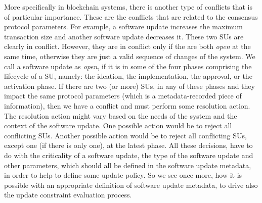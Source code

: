 More specifically in blockchain systems, there is another type of conflicts that is of particular importance. These are the conflicts that are related to the consensus protocol parameters. For example, a software update increases the maximum transaction size and another software update decreases it. These two SUs are clearly in conflict. However, they are in conflict only if the are both \emph{open} at the same time, otherwise they are just a valid sequence of changes of the system. We call a software update as \emph{open}, if it is in some of the four phases comprising the lifecycle of a SU, namely: the ideation, the implementation, the approval, or the activation phase. If there are two (or more) SUs, in any of these phases and they impact the same protocol parameters (which is a metadata-recorded piece of information), then we have a conflict and must perform some resolution action. The resolution action might vary based on the needs of the system and the context of the software update. One possible action would be to reject all conflicting SUs. Another possible action would be to reject all conflicting SUs, except one (if there is only one), at the latest phase. All these decisions, have to do with the criticality of a software update, the type of the software update and other parameters, which should all be defined in the software update metadata, in order to help to define some update policy. So we see once more, how it is possible with an appropriate definition of software update metadata, to drive also the update constraint evaluation process.



